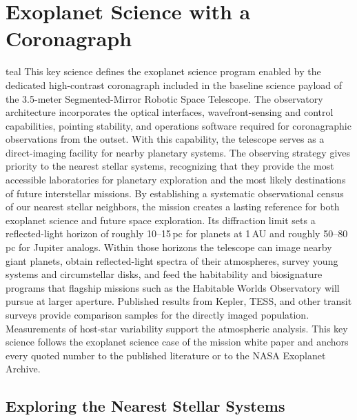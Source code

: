 \chapter{Exoplanet Science with a Coronagraph}\label{app:exoplanets}

\vspace{8mm}
\begin{leadbox}[title=Summary]{teal}
This key science defines the exoplanet science program enabled by the dedicated high-contrast coronagraph included in the baseline science payload of the 3.5-meter Segmented-Mirror Robotic Space Telescope. The observatory architecture incorporates the optical interfaces, wavefront-sensing and control capabilities, pointing stability, and operations software required for coronagraphic observations from the outset. With this capability, the telescope serves as a direct-imaging facility for nearby planetary systems.
The observing strategy gives priority to the nearest stellar systems, recognizing that they provide the most accessible laboratories for planetary exploration and the most likely destinations of future interstellar missions. 
By establishing a systematic observational census of our nearest stellar neighbors, the mission creates a lasting reference for both exoplanet science and future space exploration.
Its diffraction limit sets a reflected-light horizon of roughly 10--15\,pc for planets at 1\,AU and roughly 50--80\,pc for Jupiter analogs. Within those horizons the
telescope can image nearby giant planets, obtain reflected-light spectra
of their atmospheres, survey young systems and circumstellar disks, and
feed the habitability and biosignature programs that flagship missions
such as the Habitable Worlds Observatory will pursue at larger aperture.
Published results from Kepler, TESS, and other transit surveys provide
comparison samples for the directly imaged population. Measurements of
host-star variability support the atmospheric analysis. This key science follows the exoplanet
science case of the mission white paper and anchors every quoted number
to the published literature or to the NASA Exoplanet Archive.
\end{leadbox}
\vspace{8mm}

\section{Exploring the Nearest Stellar Systems}
\label{sec:Nearest_system}

